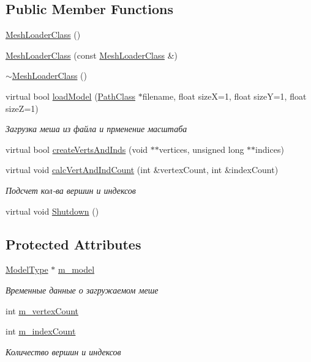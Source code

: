 \subsection*{Public Member Functions}
\begin{DoxyCompactItemize}
\item 
\hyperlink{class_mesh_loader_class_af1abc44c331a467a87a1b358944b1ecf}{Mesh\+Loader\+Class} ()
\item 
\hyperlink{class_mesh_loader_class_afbade68e7fdc2ba6a661dfc995e23f6c}{Mesh\+Loader\+Class} (const \hyperlink{class_mesh_loader_class}{Mesh\+Loader\+Class} \&)
\item 
\hyperlink{class_mesh_loader_class_aae4c8aa70fd3f9c9696ced4517a57a36}{$\sim$\+Mesh\+Loader\+Class} ()
\item 
virtual bool \hyperlink{class_mesh_loader_class_a781bb1f7e19e1a96a1e7f56d67ab4b8e}{load\+Model} (\hyperlink{class_path_class}{Path\+Class} $\ast$filename, float sizeX=1, float sizeY=1, float sizeZ=1)
\begin{DoxyCompactList}\small\item\em Загрузка меша из файла и прменение масштаба \end{DoxyCompactList}\item 
virtual bool \hyperlink{class_mesh_loader_class_afc7193c50cad8d9b6c280d1046fed468}{create\+Verts\+And\+Inds} (void $\ast$$\ast$vertices, unsigned long $\ast$$\ast$indices)
\item 
virtual void \hyperlink{class_mesh_loader_class_a887583be3507cc1af5ce7b3d966bc4e5}{calc\+Vert\+And\+Ind\+Count} (int \&vertex\+Count, int \&index\+Count)
\begin{DoxyCompactList}\small\item\em Подсчет кол-\/ва вершин и индексов \end{DoxyCompactList}\item 
virtual void \hyperlink{class_mesh_loader_class_a7d91e4ba3144e686c1215ad161d5a6b0}{Shutdown} ()
\end{DoxyCompactItemize}
\subsection*{Protected Attributes}
\begin{DoxyCompactItemize}
\item 
\hyperlink{struct_mesh_loader_class_1_1_model_type}{Model\+Type} $\ast$ \hyperlink{class_mesh_loader_class_a5b4adc40305c32c8afbe737cfebf6de4}{m\+\_\+model}
\begin{DoxyCompactList}\small\item\em Временные данные о загружаемом меше \end{DoxyCompactList}\item 
int \hyperlink{class_mesh_loader_class_a6a6f55e4d4e2321460d941d68e8a6a1c}{m\+\_\+vertex\+Count}
\item 
int \hyperlink{class_mesh_loader_class_a295180d6e2a2d0df952c53da7098ec20}{m\+\_\+index\+Count}
\begin{DoxyCompactList}\small\item\em Количество вершин и индексов \end{DoxyCompactList}\end{DoxyCompactItemize}
